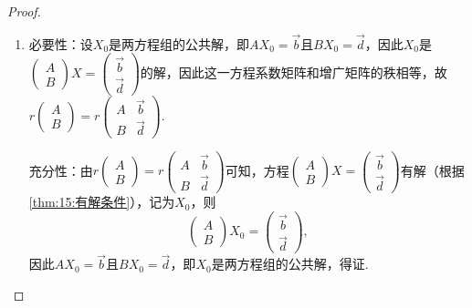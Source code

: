 \begin{proof}
    \begin{enumerate}
        \item 必要性：设$X_0$是两方程组的公共解，即$AX_0=\vec{b}$且$BX_0=\vec{d}$，因此$X_0$是$\begin{pmatrix}
                      A \\ B
                  \end{pmatrix}X=\begin{pmatrix}
                      \vec{b} \\ \vec{d}
                  \end{pmatrix}$的解，因此这一方程系数矩阵和增广矩阵的秩相等，故$r\begin{pmatrix}
                      A \\ B
                  \end{pmatrix}=r\begin{pmatrix}
                      A & \vec{b} \\ B & \vec{d}
                  \end{pmatrix}$.

              充分性：由$r\begin{pmatrix}
                      A \\ B
                  \end{pmatrix}=r\begin{pmatrix}
                      A & \vec{b} \\ B & \vec{d}
                  \end{pmatrix}$可知，方程$\begin{pmatrix}
                      A \\ B
                  \end{pmatrix}X=\begin{pmatrix}
                      \vec{b} \\ \vec{d}
                  \end{pmatrix}$有解（根据\autoref{thm:15:有解条件}），记为$X_0$，则
              \[\begin{pmatrix}
                      A \\ B
                  \end{pmatrix}X_0=\begin{pmatrix}
                      \vec{b} \\ \vec{d}
                  \end{pmatrix},\]
              因此$AX_0=\vec{b}$且$BX_0=\vec{d}$，即$X_0$是两方程组的公共解，得证.


\end{enumerate}
\end{proof}
